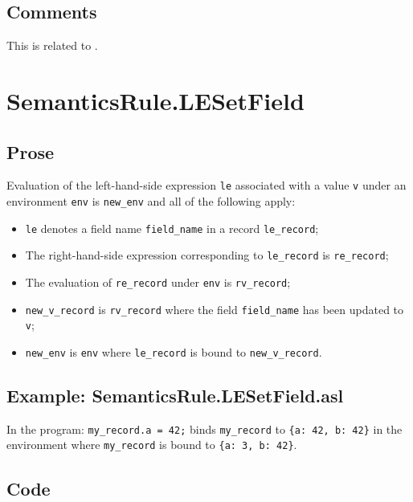 \documentclass{book}
\begin{document}
\subsection{Comments}
  This is related to .


\section{SemanticsRule.LESetField \label{sec:SemanticsRule.LESetField}}

    \subsection{Prose}
    Evaluation of the left-hand-side expression \texttt{le} associated with a
value \texttt{v} under an environment \texttt{env} is \texttt{new\_env} and all
of the following apply:
    \begin{itemize}
    \item \texttt{le} denotes a field name \texttt{field\_name} in a record \texttt{le\_record};
    \item The right-hand-side expression corresponding to \texttt{le\_record} is
      \texttt{re\_record};
    \item The evaluation of \texttt{re\_record} under \texttt{env} is \texttt{rv\_record};
    \item \texttt{new\_v\_record} is \texttt{rv\_record} where the field \texttt{field\_name} has been
      updated to \texttt{v};
    \item \texttt{new\_env} is \texttt{env} where \texttt{le\_record} is bound to
      \texttt{new\_v\_record}.
    \end{itemize}

    \subsection{Example: SemanticsRule.LESetField.asl}
    In the program:
    \texttt{my\_record.a = 42;} binds \texttt{my\_record} to \texttt{\{a: 42, b: 42\}} in the environment where \texttt{my\_record} is bound to \texttt{\{a: 3, b: 42\}}.

  \subsection{Code}
\end{document}
